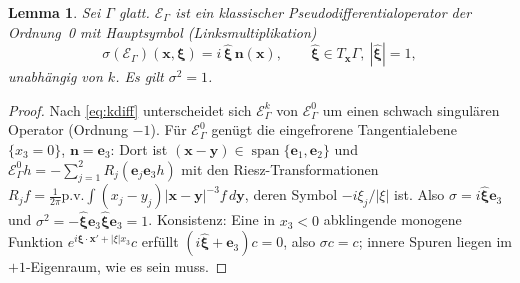 \documentclass[11pt, a4paper]{article}
\newcommand{\mvec}[1]{\boldsymbol{#1}}
\newcommand{\n}{\mvec{n}}
\newcommand{\EG}{\mathcal{E}_\Gamma}
\theoremstyle{plain}
\newtheorem{lemma}[satz]{Lemma}
\theoremstyle{definition}
\newcommand{\status}[1]{\hfill{\small\sffamily[#1]}}
\begin{document}
\begin{lemma}\label{lem:sym}\status{bewiesen}
Sei $\Gamma$ glatt. $\EG$ ist ein klassischer Pseudodifferentialoperator der
Ordnung~0 mit Hauptsymbol (Linksmultiplikation)
\[
  \sigma(\EG)(\mvec{x},\mvec{\xi}) = i\,\hat{\mvec{\xi}}\,\n(\mvec{x}),\qquad
  \hat{\mvec{\xi}}\in T_{\mvec{x}}\Gamma,\ |\hat{\mvec{\xi}}|=1,
\]
unabhängig von $k$. Es gilt $\sigma^2=1$.
\end{lemma}
\begin{proof}
Nach \eqref{eq:kdiff} unterscheidet sich $\EG^k$ von $\EG^0$ um einen schwach
singulären Operator (Ordnung $-1$). Für $\EG^0$ genügt die eingefrorene
Tangentialebene $\{x_3=0\}$, $\n=\mvec{e}_3$: Dort ist
$(\mvec{x}-\mvec{y})\in\operatorname{span}\{\mvec{e}_1,\mvec{e}_2\}$ und
$\EG^0h = -\sum_{j=1}^2 R_j(\mvec{e}_j\mvec{e}_3h)$ mit den Riesz-Transformationen
$R_jf = \tfrac{1}{2\pi}\mathrm{p.v.}\!\int(x_j-y_j)|\mvec{x}-\mvec{y}|^{-3}f\,d\mvec{y}$,
deren Symbol $-i\xi_j/|\xi|$ ist. Also $\sigma = i\hat{\mvec{\xi}}\mvec{e}_3$ und
$\sigma^2 = -\hat{\mvec{\xi}}\mvec{e}_3\hat{\mvec{\xi}}\mvec{e}_3 = 1$. Konsistenz: Eine in
$x_3<0$ abklingende monogene Funktion $e^{i\mvec{\xi}\cdot\mvec{x}'+|\xi|x_3}c$ erfüllt
$(i\hat{\mvec{\xi}}+\mvec{e}_3)c=0$, also $\sigma c = c$; innere Spuren liegen im
$+1$-Eigenraum, wie es sein muss.
\end{proof}
\end{document}
